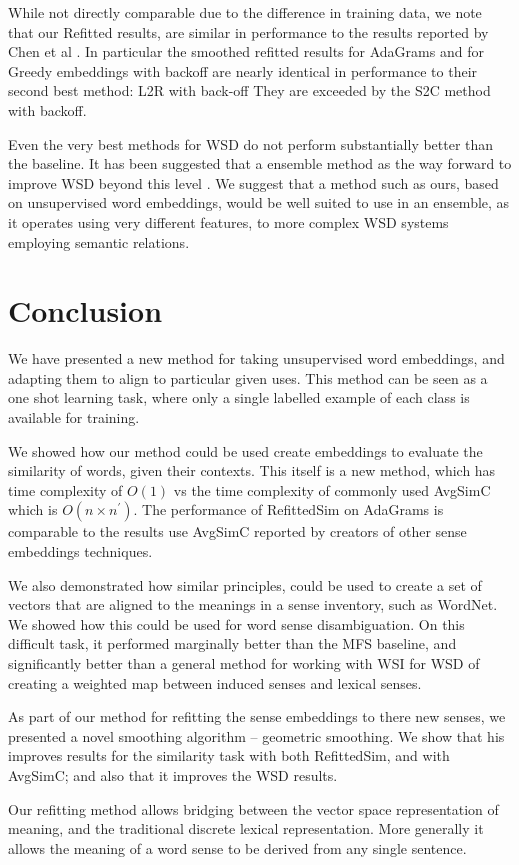 \documentclass{sig-alternate}
\begin{document}
While not directly comparable due to the difference in training data, we note that our Refitted results, are similar in performance to the results reported by Chen et al \parencite{Chen2014}. In particular the smoothed refitted results for AdaGrams and for Greedy embeddings with backoff are nearly identical in performance to their second best method: L2R with back-off They are exceeded by the S2C method with backoff. 

Even the very best methods for WSD do not perform substantially better than the baseline. It has been suggested that a ensemble method as the way forward to improve WSD beyond this level \cite{saarikoski2006building,saarikoski2006defining}.
We suggest that a method such as ours, based on unsupervised word embeddings, would be well suited to use in an ensemble, as it operates using very different features, to more complex WSD systems employing semantic relations.


\section{Conclusion}\label{conclusion}

We have presented a new method for taking unsupervised word embeddings, and adapting them to align to particular given uses. This method can be seen as a one shot learning task, where only a single labelled example of each class is available for training.


We showed how our method could be used create embeddings to evaluate the similarity of words, given their contexts. This itself is a new method, which has time complexity of $O(1)$ vs the time complexity of commonly used AvgSimC which is $O(n \times n^\prime)$. The performance of RefittedSim on AdaGrams is comparable to the results use AvgSimC reported by creators of other sense embeddings techniques.

We also demonstrated how similar principles, could be used to create a set of vectors that are aligned to the meanings in a sense inventory, such as WordNet. We showed how this could be used for word sense disambiguation. On this difficult task, it performed marginally better than the MFS baseline, and significantly better than a general method for working with WSI for WSD of creating a weighted map between induced senses and lexical senses.

As part of our method for refitting the sense embeddings to there new senses, we presented a novel smoothing algorithm -- geometric smoothing.
We show that his improves results for the similarity task with both RefittedSim, and with AvgSimC; and also that it improves the WSD results.

Our refitting method allows bridging between the vector space representation of meaning, and the traditional discrete lexical representation. More generally it allows the meaning of a word sense to be derived from any single sentence.

\newpage
\printbibliography
\end{document}
